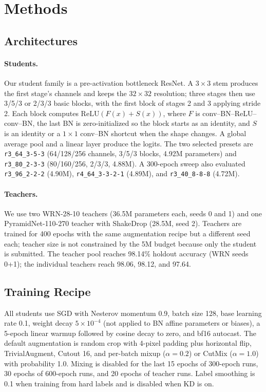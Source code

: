 \section{Methods}
\label{sec:method}

\subsection{Architectures}

\paragraph{Students.}
Our student family is a pre-activation bottleneck ResNet. A $3\times3$ stem
produces the first stage's channels and keeps the $32\times32$ resolution; three
stages then use 3/5/3 or 2/3/3 basic blocks, with the first block of stages 2 and
3 applying stride 2. Each block computes
$\mathrm{ReLU}(F(x)+S(x))$, where $F$ is conv--BN--ReLU--conv--BN, the last BN is
zero-initialized so the block starts as an identity, and $S$ is an identity or a
$1\times1$ conv--BN shortcut when the shape changes. A global average pool and a
linear layer produce the logits. The two selected presets are
\texttt{r3\_64\_3-5-3} (64/128/256 channels, 3/5/3 blocks, 4.92M parameters) and
\texttt{r3\_80\_2-3-3} (80/160/256, 2/3/3, 4.88M). A 300-epoch sweep also
evaluated \texttt{r3\_96\_2-2-2} (4.90M), \texttt{r4\_64\_3-3-2-1} (4.89M), and
\texttt{r3\_40\_8-8-8} (4.72M).

\paragraph{Teachers.}
We use two WRN-28-10 teachers (36.5M parameters each, seeds 0 and 1) and one
PyramidNet-110-270 teacher with ShakeDrop (28.5M, seed 2). Teachers are trained
for 400 epochs with the same augmentation recipe but a different seed each;
teacher size is not constrained by the 5M budget because only the student is
submitted. The teacher pool reaches 98.14\% holdout accuracy (WRN seeds 0+1); the
individual teachers reach 98.06, 98.12, and 97.64.

\subsection{Training Recipe}

All students use SGD with Nesterov momentum 0.9, batch size 128, base learning
rate 0.1, weight decay $5\times10^{-4}$ (not applied to BN affine parameters or
biases), a 5-epoch linear warmup followed by cosine decay to zero, and bf16
autocast. The default augmentation is random crop with 4-pixel padding plus
horizontal flip, TrivialAugment, Cutout 16, and per-batch mixup ($\alpha=0.2$) or
CutMix ($\alpha=1.0$) with probability 1.0. Mixing is disabled for the last 15
epochs of 300-epoch runs, 30 epochs of 600-epoch runs, and 20 epochs of teacher
runs. Label smoothing is 0.1 when training from hard labels and is disabled when
KD is on.

